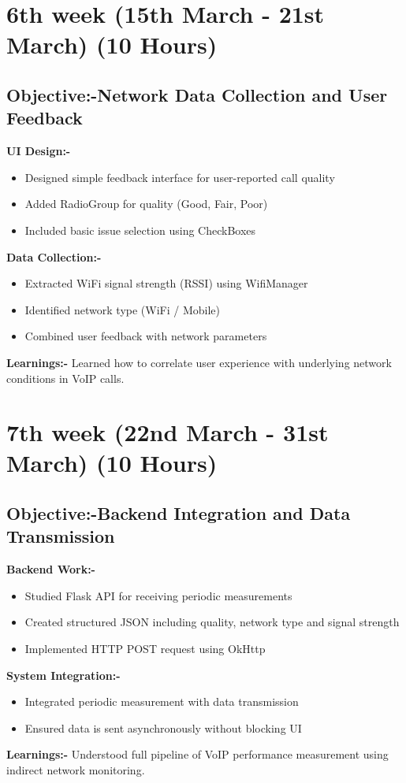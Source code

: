 \documentclass{article}
\begin{document}
\section{6th week (15th March - 21st March) (10 Hours)}
\subsection{Objective:-Network Data Collection and User Feedback}
\textbf{UI Design:-}
\begin{itemize}
\item Designed simple feedback interface for user-reported call quality
\item Added RadioGroup for quality (Good, Fair, Poor)
\item Included basic issue selection using CheckBoxes
\end{itemize}
\vspace{2mm}
\textbf{Data Collection:-}
\begin{itemize}
\item Extracted WiFi signal strength (RSSI) using WifiManager
\item Identified network type (WiFi / Mobile)
\item Combined user feedback with network parameters
\end{itemize}
\vspace{2mm}
\textbf{Learnings:-} Learned how to correlate user experience with underlying network conditions in VoIP calls.

\section{7th week (22nd March - 31st March) (10 Hours)}
\subsection{Objective:-Backend Integration and Data Transmission}
\textbf{Backend Work:-}
\begin{itemize}
\item Studied Flask API for receiving periodic measurements
\item Created structured JSON including quality, network type and signal strength
\item Implemented HTTP POST request using OkHttp
\end{itemize}
\vspace{2mm}
\textbf{System Integration:-}
\begin{itemize}
\item Integrated periodic measurement with data transmission
\item Ensured data is sent asynchronously without blocking UI
\end{itemize}
\vspace{2mm}
\textbf{Learnings:-} Understood full pipeline of VoIP performance measurement using indirect network monitoring.
\end{document}
